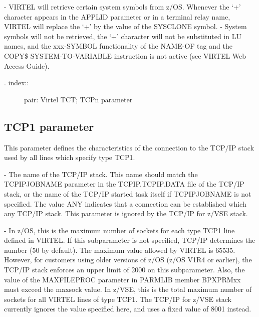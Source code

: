 \documentclass[letterpaper,10pt,english]{sphinxmanual}
\begin{document}
 - VIRTEL will retrieve certain system symbols from z/OS. Whenever the ‘+’ character appears in the APPLID parameter or in a terminal relay name, VIRTEL will replace the ‘+’ by the value of the SYSCLONE symbol.
 - System symbols will not be retrieved, the ‘+’ character will not be substituted in LU names, and the xxx-SYMBOL functionality of the NAME-OF tag and the COPY\$ SYSTEM-TO-VARIABLE instruction is not active (see VIRTEL Web Access Guide).
\begin{description}
\item[{. index::}] \leavevmode
pair: Virtel TCT; TCPn parameter

\end{description}


\subsection{TCP1 parameter}
\label{\detokenize{Installation_Guide:tcp1-parameter}}
\begin{sphinxVerbatim}[commandchars=\\\{\}]
   
\PYG{p}{[}\PYG{p}{]}\PYG{p}{[}\PYG{p}{]}\PYG{p}{[}\PYG{p}{]}\PYG{p}{[}\PYG{p}{]}
\end{sphinxVerbatim}

This parameter defines the characteristics of the connection to the TCP/IP stack used by all lines which specify type TCP1.

 - The name of the TCP/IP stack. This name should match the TCPIPJOBNAME parameter in the TCPIP.TCPIP.DATA file of the TCP/IP stack, or the name of the TCP/IP started task itself if TCPIPJOBNAME is not specified. The value ANY indicates that a connection can be established which any TCP/IP stack. This parameter is ignored by the TCP/IP for z/VSE stack.

 - In z/OS, this is the maximum number of sockets for each type TCP1 line defined in VIRTEL. If this subparameter is not specified, TCP/IP determines the number (50 by default). The maximum value allowed by VIRTEL is 65535. However, for customers using older versions of z/OS (z/OS V1R4 or earlier), the TCP/IP stack enforces an upper limit of 2000 on this subparameter. Also, the value of the MAXFILEPROC parameter in PARMLIB member BPXPRMxx must exceed the maxsock value. In z/VSE, this is the total maximum number of sockets for all VIRTEL lines of type TCP1. The TCP/IP for z/VSE stack currently ignores the value specified here, and uses a fixed value of 8001 instead.
\end{document}
